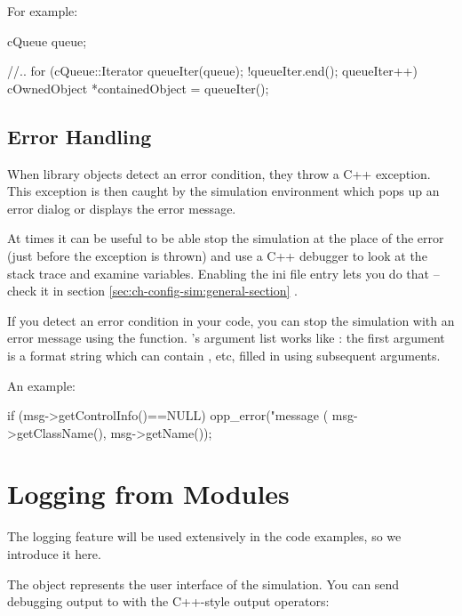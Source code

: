 For example:

\begin{cpp}
cQueue queue;

//..
for (cQueue::Iterator queueIter(queue); !queueIter.end(); queueIter++)
{
    cOwnedObject *containedObject = queueIter();
}
\end{cpp}



\subsection{Error Handling}


When library objects detect an error condition, they throw a C++ exception.
This exception is then caught by the simulation environment which pops up
an error dialog or displays the error message.

At times it can be useful to be able stop the simulation at the place of the error
(just before the exception is thrown) and use a C++ debugger to look
at the stack trace and examine variables. Enabling the 
ini file entry lets you do that -- check it in section
\ref{sec:ch-config-sim:general-section}  .

If you detect an error condition in your code, you can stop the
simulation with an error message using the  function.
's argument list works like : the
first argument is a format string which can contain ,  etc,
filled in using subsequent arguments.

An example:

\begin{cpp}
if (msg->getControlInfo()==NULL)
    opp_error("message (%
              msg->getClassName(), msg->getName());
\end{cpp}



\section{Logging from Modules}

The logging feature will be used extensively in the code examples, so
we introduce it here.

The  object represents the user interface of the
simulation.  You can send debugging output to  with the C++-style
output operators:

